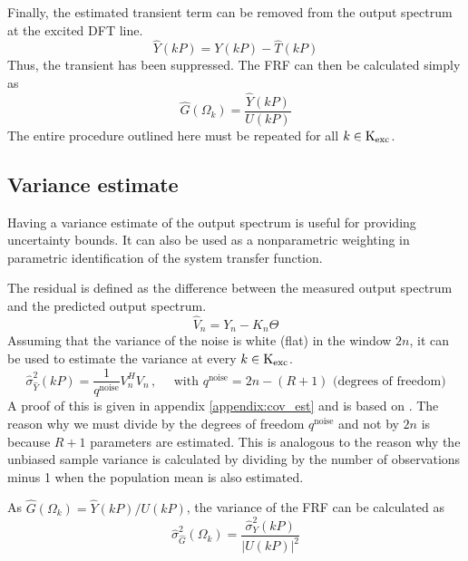 Finally, the estimated transient term can be removed from the output spectrum at the excited DFT line.
\begin{equation*}
\boxed{
    \hat{Y}(kP) = Y(kP) - \hat{T}(kP)
}
\end{equation*}
Thus, the transient has been suppressed. The FRF can then be calculated simply as
\begin{equation*}
    \hat G(\Omega_k) = \frac{\hat{Y}(kP)}{U(kP)}
\end{equation*}
The entire procedure outlined here must be repeated for all $k \in \text{K}_{\text{exc}}$.

\subsection{Variance estimate}
Having a variance estimate of the output spectrum is useful for providing uncertainty bounds. It can also be used as a nonparametric weighting in parametric identification of the system transfer function. %

The residual is defined as the difference between the measured output spectrum and the predicted output spectrum.
\begin{equation*}
    \hat{V}_n = Y_n - K_n \hat{\Theta}
\end{equation*}
Assuming that the variance of the noise is white (flat) in the window $2n$, it can be used to estimate the variance at every $k \in \text{K}_{\text{exc}}$.
\begin{equation*}
    \hat\sigma^2_{\hat Y}(kP) = \frac{1}{q^{\text{noise}}} V_n^H V_n \,,\quad \text{ with } q^{\text{noise}} = 2 n - (R + 1) \text{ (degrees of freedom)}
\end{equation*}
A proof of this is given in appendix \ref{appendix:cov_est} and is based on \cite[Appendix 7.B]{pintelon_book}. The reason why we must divide by the degrees of freedom $q^{\text{noise}}$ and not by $2n$ is because $R+1$ parameters are estimated. This is analogous to the reason why the unbiased sample variance is calculated by dividing by the number of observations minus 1 when the population mean is also estimated. 

As $\hat G(\Omega_k) = \hat{Y}(kP)/U(kP)$, the variance of the FRF can be calculated as
\begin{equation}
    \hat\sigma^2_{\hat G}(\Omega_k) = \frac{\hat\sigma^2_Y(kP)}{|U(kP)|^2}
    \label{eq:variance_estimate_no_input_noise}
\end{equation}

